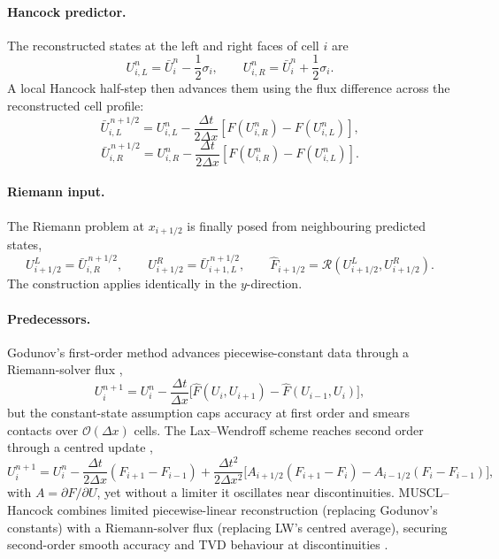 \paragraph{Hancock predictor.}
The reconstructed states at the left and right faces of cell \(i\) are
\begin{equation}\label{eq:ch3-reconstructed-states}
  U_{i,L}^{n}=\bar U_i^{n}-\frac12\sigma_i,
  \qquad
  U_{i,R}^{n}=\bar U_i^{n}+\frac12\sigma_i .
\end{equation}
A local Hancock half-step then advances them using the flux difference across
the reconstructed cell profile:
\begin{equation}\label{eq:ch3-hancock-half-step-L}
  \bar U_{i,L}^{\,n+1/2}
  =
  U_{i,L}^{n}
  -\frac{\Delta t}{2\Delta x}
  \left[F(U_{i,R}^{n})-F(U_{i,L}^{n})\right],
\end{equation}
\begin{equation}\label{eq:ch3-hancock-half-step-R}
  \bar U_{i,R}^{\,n+1/2}
  =
  U_{i,R}^{n}
  -\frac{\Delta t}{2\Delta x}
  \left[F(U_{i,R}^{n})-F(U_{i,L}^{n})\right].
\end{equation}
\paragraph{Riemann input.}
The Riemann problem at \(x_{i+1/2}\) is finally posed from neighbouring
predicted states,
\begin{equation}\label{eq:ch3-riemann-input}
  U_{i+1/2}^{L}=\bar U_{i,R}^{\,n+1/2},
  \qquad
  U_{i+1/2}^{R}=\bar U_{i+1,L}^{\,n+1/2},
  \qquad
  \widehat F_{i+1/2}
  =
  \mathcal{R}\!\left(U_{i+1/2}^{L},U_{i+1/2}^{R}\right).
\end{equation}
The construction applies identically in the \(y\)-direction.

\paragraph{Predecessors.}
Godunov's first-order method advances piecewise-constant data through a
Riemann-solver flux \citep{toro2009},
\begin{equation}\label{eq:ch3-godunov}
  U_i^{n+1}
  = U_i^n
  - \frac{\Delta t}{\Delta x}\bigl[\widehat F(U_i,U_{i+1}) - \widehat F(U_{i-1},U_i)\bigr],
\end{equation}
but the constant-state assumption caps accuracy at first order and smears
contacts over \(\mathcal{O}(\Delta x)\) cells. The Lax--Wendroff scheme reaches
second order through a centred update \citep{toro2009},
\begin{equation}\label{eq:ch3-lax-wendroff}
  U_i^{n+1}
  = U_i^n
  - \frac{\Delta t}{2\Delta x}(F_{i+1}-F_{i-1})
  + \frac{\Delta t^{2}}{2\Delta x^{2}}\bigl[A_{i+1/2}(F_{i+1}-F_i) - A_{i-1/2}(F_i-F_{i-1})\bigr],
\end{equation}
with \(A=\partial F/\partial U\), yet without a limiter it oscillates near
discontinuities. MUSCL--Hancock combines limited piecewise-linear
reconstruction (replacing Godunov's constants) with a Riemann-solver flux
(replacing LW's centred average), securing second-order smooth accuracy and
TVD behaviour at discontinuities \citep{vanleer_1979}.

